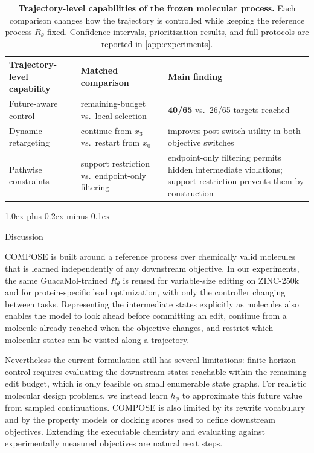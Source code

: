 \documentclass{article}
\makeatletter
\theoremstyle{definition}
\theoremstyle{remark}
\def\section{\@startsection{section}{1}{\z@}{-1.4ex plus -0.4ex minus -.2ex}%
  {1.0ex plus 0.2ex minus 0.1ex}{\large\sc\raggedright}}
\makeatother
\begin{document}
\begin{table}[!ht]
\centering\small\setlength{\tabcolsep}{6pt}
\begin{tabular}{@{}p{} p{} p{}@{}}
\toprule
Trajectory-level capability & Matched comparison & Main finding \\
\midrule
Future-aware control & remaining-budget vs.\ local selection
  & \textbf{40/65} vs.\ 26/65 targets reached \\
\addlinespace[2pt]
Dynamic retargeting & continue from $x_3$ vs.\ restart from $x_0$
  & improves post-switch utility in both objective switches \\
\addlinespace[2pt]
Pathwise constraints & support restriction vs.\ endpoint-only filtering
  & endpoint-only filtering permits hidden intermediate violations; support
    restriction prevents them by construction \\
\bottomrule
\end{tabular}
\caption{\small\textbf{Trajectory-level capabilities of the frozen molecular
process.} Each comparison changes how the trajectory is controlled while keeping
the reference process $R_\theta$ fixed. Confidence intervals, prioritization
results, and full protocols are reported in \cref{app:experiments}.}
\label{tab:mechanism}%
\label{fig:mechanism}
\end{table}

\section{Discussion}
\label{sec:discussion}

COMPOSE is built around a reference process over chemically valid molecules that is learned independently of any
downstream objective. In our experiments, the same GuacaMol-trained $R_\theta$ is
reused for variable-size editing on ZINC-250k and for protein-specific lead
optimization, with only the controller changing between tasks. Representing the
intermediate states explicitly as molecules also enables the model to look ahead
before committing an edit, continue from a molecule already reached when the
objective changes, and restrict which molecular states can be visited along a
trajectory.

Nevertheless the current formulation still has several limitations: finite-horizon control requires evaluating the downstream states reachable within the remaining edit budget, which is only feasible on small enumerable state graphs. For realistic molecular design problems, we instead learn $h_\phi$ to approximate this future value from sampled continuations. COMPOSE is also limited by its rewrite vocabulary and by the property models or docking scores used to define downstream objectives. Extending the executable chemistry and evaluating against experimentally measured objectives are natural next steps.
\end{document}
